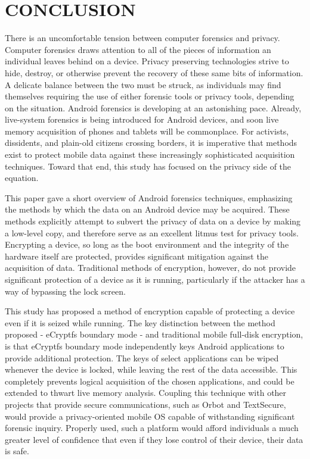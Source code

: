 \chapter{CONCLUSION}

There is an uncomfortable tension between computer forensics and privacy. Computer forensics draws attention to all of the pieces of
information an individual leaves behind on a device.  Privacy preserving technologies strive to hide, destroy, or otherwise prevent
the recovery of these same bits of information. A delicate balance between the two must be struck, as individuals may find
themselves requiring the use of either forensic tools or privacy tools, depending on the situation.  Android forensics is developing
at an astonishing pace.  Already, live-system forensics is being introduced for Android devices, and soon live memory acquisition of
phones and tablets will be commonplace. For activists, dissidents, and plain-old citizens crossing borders, it is imperative that
methods exist to protect mobile data against these increasingly sophisticated acquisition techniques.  Toward that end, this study
has focused on the privacy side of the equation.

This paper gave a short overview of Android forensics techniques, emphasizing the methods by which the data
on an Android device may be acquired. These methods explicitly attempt to subvert the privacy of data on a device by making a
low-level copy, and therefore serve as an excellent litmus test for privacy tools. Encrypting a device, so long as the
boot environment and the integrity of the hardware itself are protected, provides significant mitigation against the acquisition of
data. Traditional methods of encryption, however, do not provide significant protection of a device as it is running, particularly
if the attacker has a way of bypassing the lock screen.

This study has proposed a method of encryption capable of protecting a device even if it is seized while running.  The key
distinction between the method proposed - eCryptfs boundary mode - and traditional mobile full-disk encryption, is that eCryptfs
boundary mode independently keys Android applications to provide additional protection. The keys of select applications can be wiped
whenever the device is locked, while leaving the rest of the data accessible. This completely prevents logical acquisition of the
chosen applications, and could be extended to thwart live memory analysis. Coupling this technique with other projects
that provide secure communications, such as Orbot and TextSecure, would provide a privacy-oriented mobile OS capable of withstanding
significant forensic inquiry. Properly used, such a platform would afford individuals a much greater level of confidence that even
if they lose control of their device, their data is safe.
